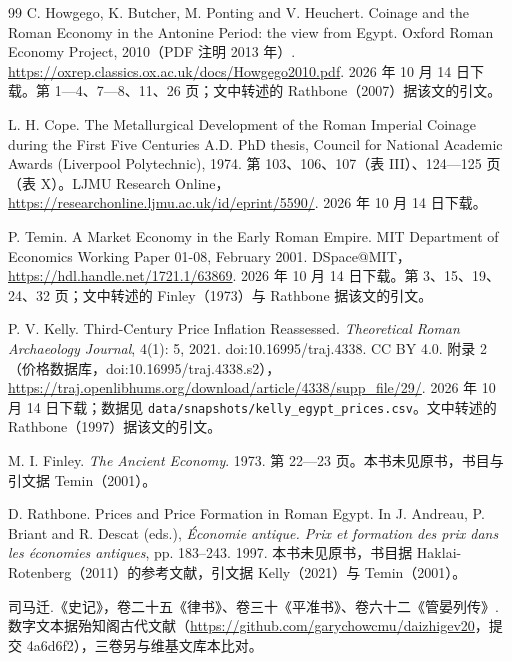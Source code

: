 \begin{thebibliography}{99}
 C. Howgego, K. Butcher, M. Ponting and V. Heuchert. Coinage and the Roman Economy in the Antonine Period: the view from Egypt. Oxford Roman Economy Project, 2010（PDF 注明 2013 年）. \url{https://oxrep.classics.ox.ac.uk/docs/Howgego2010.pdf}. 2026 年 10 月 14 日下载。第 1—4、7—8、11、26 页；文中转述的 Rathbone（2007）据该文的引文。

 L. H. Cope. The Metallurgical Development of the Roman Imperial Coinage during the First Five Centuries A.D. PhD thesis, Council for National Academic Awards (Liverpool Polytechnic), 1974. 第 103、106、107（表 III）、124—125 页（表 X）。LJMU Research Online，\url{https://researchonline.ljmu.ac.uk/id/eprint/5590/}. 2026 年 10 月 14 日下载。

 P. Temin. A Market Economy in the Early Roman Empire. MIT Department of Economics Working Paper 01-08, February 2001. DSpace@MIT，\url{https://hdl.handle.net/1721.1/63869}. 2026 年 10 月 14 日下载。第 3、15、19、24、32 页；文中转述的 Finley（1973）与 Rathbone 据该文的引文。

 P. V. Kelly. Third-Century Price Inflation Reassessed. \emph{Theoretical Roman Archaeology Journal}, 4(1): 5, 2021. doi:10.16995/traj.4338. CC BY 4.0. 附录 2（价格数据库，doi:10.16995/traj.4338.s2），\url{https://traj.openlibhums.org/download/article/4338/supp_file/29/}. 2026 年 10 月 14 日下载；数据见 \texttt{data/snapshots/kelly\_egypt\_prices.csv}。文中转述的 Rathbone（1997）据该文的引文。

 M. I. Finley. \emph{The Ancient Economy}. 1973. 第 22—23 页。本书未见原书，书目与引文据 Temin（2001）。

 D. Rathbone. Prices and Price Formation in Roman Egypt. In J. Andreau, P. Briant and R. Descat (eds.), \emph{Économie antique. Prix et formation des prix dans les économies antiques}, pp. 183--243. 1997. 本书未见原书，书目据 Haklai-Rotenberg（2011）的参考文献，引文据 Kelly（2021）与 Temin（2001）。

 司马迁.《史记》，卷二十五《律书》、卷三十《平准书》、卷六十二《管晏列传》. 数字文本据殆知阁古代文献（\url{https://github.com/garychowcmu/daizhigev20}，提交 4a6d6f2），三卷另与维基文库本比对。


\end{thebibliography}
